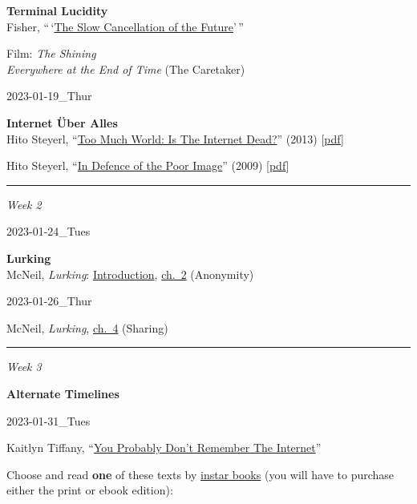 \documentclass[
  letterpaper,
  DIV=11,
  numbers=noendperiod]{scrartcl}
\begin{document}
\textbf{Terminal Lucidity}\\
Fisher,
``\,`\href{https://canvas.emerson.edu/courses/1932613/files/144544397?wrap=1}{The
Slow Cancellation of the Future}'\,''

Film: \emph{The Shining}\\
\emph{Everywhere at the End of Time} (The Caretaker)

2023-01-19\_Thur

\textbf{Internet Über Alles}\\
Hito Steyerl,
``\href{https://www.e-flux.com/journal/49/60004/too-much-world-is-the-internet-dead/}{Too
Much World: Is The Internet Dead?}'' (2013)
{[}\href{https://canvas.emerson.edu/courses/1932613/files/144544369?wrap=1}{pdf}{]}

Hito Steyerl,
``\href{https://www.e-flux.com/journal/10/61362/in-defense-of-the-poor-image/}{In
Defence of the Poor Image}'' (2009)
{[}\href{https://canvas.emerson.edu/courses/1932613/files/144727898?wrap=1}{pdf}{]}

\begin{center}\rule{0.5\linewidth}{0.5pt}\end{center}

\emph{Week 2}

2023-01-24\_Tues

\textbf{Lurking}\\
McNeil, \emph{Lurking}:
\href{https://canvas.emerson.edu/courses/1932613/files/144549946?wrap=1}{Introduction},
\href{https://canvas.emerson.edu/courses/1932613/files/144549950?wrap=1}{ch.~2}
(Anonymity)

2023-01-26\_Thur

McNeil, \emph{Lurking},
\href{https://canvas.emerson.edu/courses/1932613/files/144549949?wrap=1}{ch.~4}
(Sharing)

\begin{center}\rule{0.5\linewidth}{0.5pt}\end{center}

\emph{Week 3}

\textbf{Alternate Timelines}

2023-01-31\_Tues

Kaitlyn Tiffany,
``\href{https://canvas.emerson.edu/courses/1932613/files/145219877?wrap=1}{You
Probably Don't Remember The Internet}''

Choose and read \textbf{one} of these texts by
\href{http://www.instarbooks.com/remember-the-internet.html}{instar
books} (you will have to purchase either the print or ebook edition):
\end{document}
